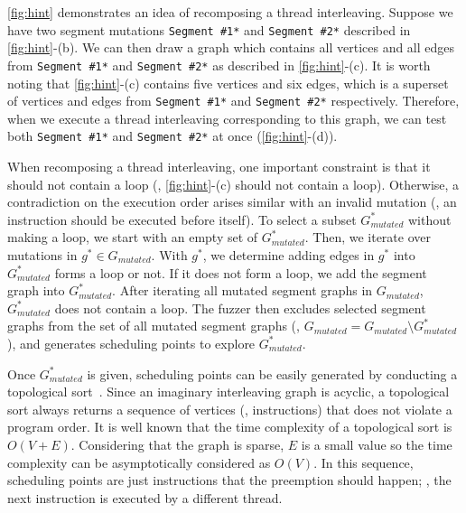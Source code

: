 \autoref{fig:hint} demonstrates an idea of recomposing a thread
interleaving. Suppose we have two segment mutations \texttt{Segment
  \#1*} and \texttt{Segment \#2*} described in \autoref{fig:hint}-(b).
%
We can then draw a graph which contains all vertices and all edges
from \texttt{Segment \#1*} and \texttt{Segment \#2*} as described in
\autoref{fig:hint}-(c).
%
It is worth noting that \autoref{fig:hint}-(c) contains five vertices
and six edges, which is a superset of vertices and edges from
\texttt{Segment \#1*} and \texttt{Segment \#2*} respectively.
%
Therefore, when we execute a thread interleaving corresponding to this
graph, we can test both \texttt{Segment \#1*} and \texttt{Segment
  \#2*} at once (\autoref{fig:hint}-(d)).



When recomposing a thread interleaving, one important constraint is
that it should not contain a loop (\ie, \autoref{fig:hint}-(c) should
not contain a loop). Otherwise, a contradiction on the execution order
arises similar with an invalid mutation (\ie, an instruction should be
executed before itself).
%
To select a subset $G^*_{mutated}$ without making a loop, we start
with an empty set of $G^*_{mutated}$. Then, we iterate over mutations
in $g^* \in G_{mutated}$. With $g^*$, we determine adding edges in
$g^*$ into $G^*_{mutated}$ forms a loop or not. If it does not form a
loop, we add the segment graph into $G^*_{mutated}$.
%
After iterating all mutated segment graphs in $G_{mutated}$,
$G^*_{mutated}$ does not contain a loop. The fuzzer then excludes
selected segment graphs from the set of all mutated segment graphs
(\ie, $G_{mutated} = G_{mutated} \setminus G^*_{mutated}$), and
generates scheduling points to explore $G^*_{mutated}$.












%
Once $G^{*}_{mutated}$ is given, scheduling points can be easily
generated by conducting a topological sort~\cite{topologicalsort}.
%
Since an imaginary interleaving graph is acyclic, a topological sort
always returns a sequence of vertices (\ie, instructions) that does
not violate a program order.
%
It is well known that the time complexity of a topological sort is
$O(V+E)$. Considering that the graph is sparse, $E$ is a small value
so the time complexity can be asymptotically considered as $O(V)$.
%
In this sequence, scheduling points are just instructions that the
preemption should happen; \ie, the next instruction is executed by a
different thread.





